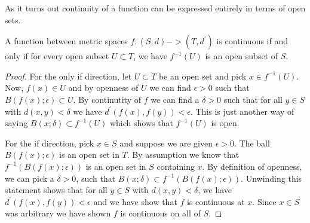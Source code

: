 As it turns out continuity of a function can be expressed entirely in
terms of open sets.
\begin{lem}A function between metric spaces $f : (S,d) -> (T,d^\prime)$ is continuous
  if and only if for every open subset $U \subset T$, we have $f^{-1}(U)$ is an
  open subset of $S$.
\end{lem}
\begin{proof}For the only if direction, let $U \subset T$ be an open set and pick $x \in
  f^{-1}(U)$.  Now, $f(x) \in U$ and by openness of $U$ we can find $\epsilon
  > 0$ such that $B(f(x); \epsilon) \subset U$.  By continutity of $f$
  we can find a $\delta > 0$ such that for all $y \in S$ with $d(x,y) <
  \delta$ we  have $d^\prime(f(x),f(y)) < \epsilon$.  This is just
  another way of saying $B(x; \delta) \subset f^{-1}(U)$ which shows
  that $f^{-1}(U)$ is open.

For the if direction, pick $x \in S$ and suppose we are given
$\epsilon > 0$.  The ball $B(f(x); \epsilon)$ is an open set in $T$.  
By assumption we know that $f^{-1}(B(f(x); \epsilon))$ is
an open set in $S$ containing $x$.   By definition of openness, we can pick a $\delta > 0$, such that 
$B(x;\delta) \subset f^{-1}(B(f(x); \epsilon))$.  Unwinding this
statement shows that for all $y \in S$ with $d(x,y) < \delta$, we have
$d^\prime(f(x),f(y)) < \epsilon$ and we have show that $f$ is
continuous at $x$.  Since $x \in S$ was arbitrary we have shown $f$ is
continuous on all of $S$.
\end{proof}

